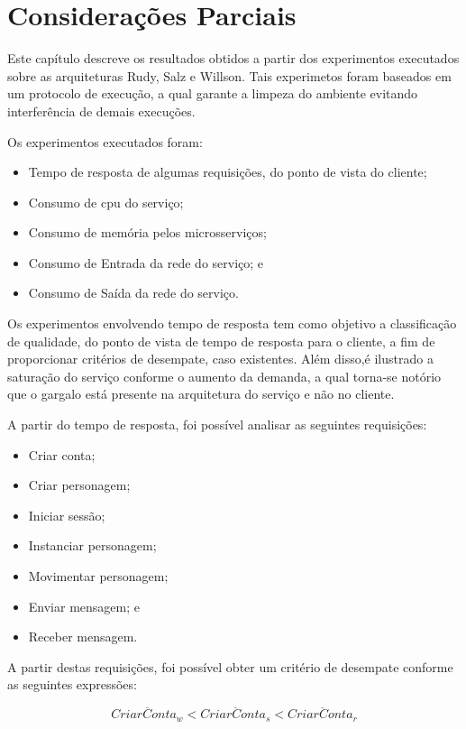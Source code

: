 \section{Considerações Parciais}
\label{sec:experimentos_conc}

Este capítulo descreve os resultados obtidos a partir dos experimentos executados sobre as arquiteturas Rudy, Salz e Willson.
%
Tais experimetos foram baseados em um protocolo de execução, a qual garante a limpeza do ambiente evitando interferência de demais execuções.

Os experimentos executados foram:

\begin{itemize}
 \item Tempo de resposta de algumas requisições, do ponto de vista do cliente;
 \item Consumo de \ac{cpu} do serviço;
 \item Consumo de memória pelos microsserviços;
 \item Consumo de Entrada da rede do serviço; e
 \item Consumo de Saída da rede do serviço.
\end{itemize}

Os experimentos envolvendo tempo de resposta tem como objetivo a classificação de qualidade, do ponto de vista de tempo de resposta para o cliente, a fim de proporcionar critérios de desempate, caso existentes.
%
Além disso,é ilustrado a saturação do serviço conforme o aumento da demanda, a qual torna-se notório que o gargalo está presente na arquitetura do serviço e não no cliente.

A partir do tempo de resposta, foi possível analisar as seguintes requisições:

\begin{itemize}
    \item Criar conta;
    \item Criar personagem;
    \item Iniciar sessão; 
    \item Instanciar personagem;
    \item Movimentar personagem;
    \item Enviar mensagem; e
    \item Receber mensagem.
\end{itemize}

A partir destas requisições, foi possível obter um critério de desempate conforme as seguintes expressões:

$$
  \overline{CriarConta_{w}} < \overline{CriarConta_{s}} < \overline{CriarConta_{r}}
$$

